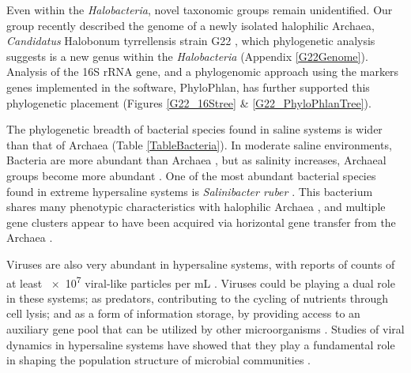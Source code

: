 Even within the \textit{Halobacteria}, novel taxonomic groups remain unidentified. Our group recently described the genome of a newly isolated halophilic Archaea,  \textit{Candidatus} Halobonum tyrrellensis strain G22 \cite{Ugalde:2013hb}, which phylogenetic analysis suggests is a new genus within the \textit{Halobacteria} (Appendix \ref{G22Genome}). Analysis of the 16S rRNA gene, and a phylogenomic approach using the markers genes implemented in the software, PhyloPhlan, has further supported this phylogenetic placement (Figures \ref{G22_16Stree} \& \ref{G22_PhyloPhlanTree}).

The phylogenetic breadth of bacterial species found in saline systems is wider than that of Archaea (Table \ref{TableBacteria}). In moderate saline environments, Bacteria are more abundant than Archaea \cite{Oren:2008ej,Ghai:2011hn,Ghai:2012fb,Casamayor:2002tf}, but as salinity increases, Archaeal groups become more abundant \cite{Ghai:2011hn,Casamayor:2002tf,Mutlu:2008dk}. One of the most abundant bacterial species found in extreme hypersaline systems is \textit{Salinibacter ruber} \cite{Anton:2008eb}. This bacterium shares many phenotypic characteristics with halophilic Archaea \cite{Oren:2013gy}, and multiple gene clusters appear to have been acquired via horizontal gene transfer from the Archaea \cite{Mongodin:2005ie}.

Viruses are also very abundant in hypersaline systems, with reports of counts of at least \num{e7} viral-like particles per mL \cite{DyallSmith:2003eu}. Viruses could be playing a dual role in these systems; as predators, contributing to the cycling of nutrients through cell lysis; and as a form of information storage, by providing access to an auxiliary gene pool that can be utilized by other microorganisms \cite{Lindell:2005gz,Williamson:2008vs,Hurwitz:2013gl}.  Studies of viral dynamics in hypersaline systems have showed that they play a fundamental role in shaping the population structure of microbial communities \cite{RodriguezBrito:2010in,RodriguezValera:2009cr}.

